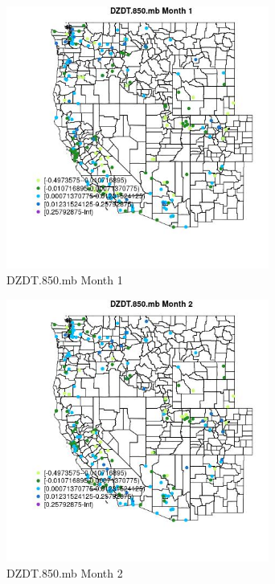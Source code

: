 \begin{figure} 
\centering  
\includegraphics[width=0.77\textwidth]{Code_Outputs/Report_ML_input_PM25_Step4_part_e_de_duplicated_aveswNAs_MapObsMo1DZDT850mb.jpg} 
\caption{\label{fig:Report_ML_input_PM25_Step4_part_e_de_duplicated_aveswNAsMapObsMo1DZDT850mb}DZDT.850.mb Month 1} 
\end{figure} 
 

\clearpage 

\begin{figure} 
\centering  
\includegraphics[width=0.77\textwidth]{Code_Outputs/Report_ML_input_PM25_Step4_part_e_de_duplicated_aveswNAs_MapObsMo2DZDT850mb.jpg} 
\caption{\label{fig:Report_ML_input_PM25_Step4_part_e_de_duplicated_aveswNAsMapObsMo2DZDT850mb}DZDT.850.mb Month 2} 
\end{figure} 
 

